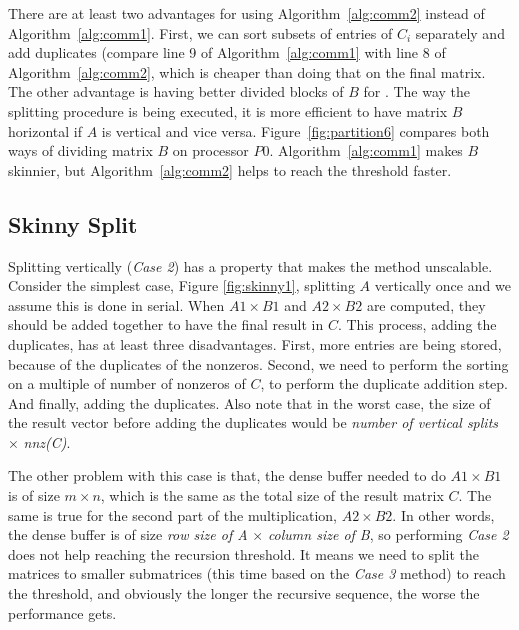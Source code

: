 There are at least two advantages for using Algorithm~\ref{alg:comm2} instead of Algorithm~\ref{alg:comm1}. First, we can sort subsets of entries of $C_i$ separately and add duplicates (compare line 9 of Algorithm~\ref{alg:comm1} with line $8$ of Algorithm~\ref{alg:comm2}, which is cheaper than doing that on the final matrix. The other advantage is having better divided blocks of $B$ for \recmm. The way the splitting procedure is being executed, it is more efficient to have matrix $B$ horizontal if $A$ is vertical and vice versa. Figure~\ref{fig:partition6} compares both ways of dividing matrix $B$ on processor $P0$. Algorithm~\ref{alg:comm1} makes $B$ skinnier, but Algorithm~\ref{alg:comm2} helps to reach the threshold faster.

\subsection{Skinny Split}
\label{sec:1split}


Splitting vertically (\textit{Case 2}) has a property that makes the method unscalable. Consider the simplest case, Figure \ref{fig:skinny1}, splitting $A$ vertically once and we assume this is done in serial. When $A1 \times B1$ and $A2 \times B2$ are computed, they should be added together to have the final result in $C$. This process, adding the duplicates, has at least three disadvantages. First, more entries are being stored, because of the duplicates of the nonzeros. Second, we need to perform the sorting on a multiple of number of nonzeros of $C$, to perform the duplicate addition step. And finally, adding the duplicates. Also note that in the worst case, the size of the result vector before adding the duplicates would be \textit{number of vertical splits} $\times$ \textit{nnz(C)}. 

The other problem with this case is that, the dense buffer needed to do $A1 \times B1$ is of size $m \times n$, which is the same as the total size of the result matrix $C$. The same is true for the second part of the multiplication, $A2 \times B2$. In other words, the dense buffer is of size \textit{row size of A} $\times$ \textit{column size of B}, so performing \textit{Case 2} does not help reaching the recursion threshold.
It means we need to split the matrices to smaller submatrices (this time based on the \textit{Case 3} method) to reach the threshold, and obviously the longer the recursive sequence, the worse the performance gets.

